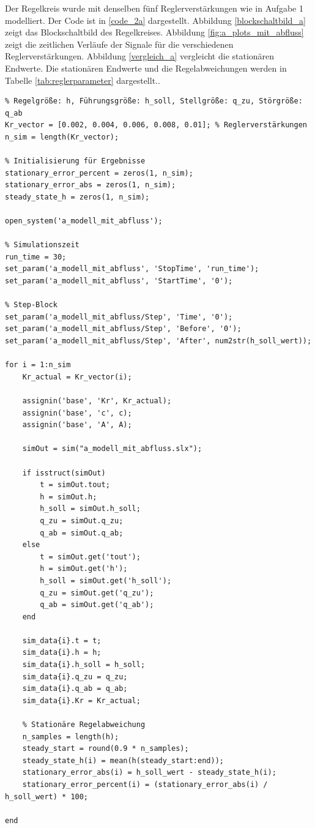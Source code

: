 Der Regelkreis wurde mit denselben fünf Reglerverstärkungen wie in Aufgabe 1 modelliert. Der Code ist in \ref{code_2a} dargestellt. Abbildung \ref{blockschaltbild_a} zeigt das Blockschaltbild des Regelkreises. Abbildung \ref{fig:a_plots_mit_abfluss} zeigt die zeitlichen Verläufe der Signale für die verschiedenen Reglerverstärkungen. Abbildung \ref{vergleich_a} vergleicht die stationären Endwerte. Die stationären Endwerte und die Regelabweichungen werden in Tabelle \ref{tab:reglerparameter} dargestellt..

\begin{sourcecode}
    \caption{\textit{Matlab}-Code zur Simulation und Berechnung der stationären Regelabweichung}
    \begin{verbatim}
% Regelgröße: h, Führungsgröße: h_soll, Stellgröße: q_zu, Störgröße: q_ab
Kr_vector = [0.002, 0.004, 0.006, 0.008, 0.01]; % Reglerverstärkungen
n_sim = length(Kr_vector);

% Initialisierung für Ergebnisse
stationary_error_percent = zeros(1, n_sim);
stationary_error_abs = zeros(1, n_sim);
steady_state_h = zeros(1, n_sim);

open_system('a_modell_mit_abfluss');

% Simulationszeit
run_time = 30;
set_param('a_modell_mit_abfluss', 'StopTime', 'run_time');
set_param('a_modell_mit_abfluss', 'StartTime', '0');

% Step-Block
set_param('a_modell_mit_abfluss/Step', 'Time', '0');
set_param('a_modell_mit_abfluss/Step', 'Before', '0');
set_param('a_modell_mit_abfluss/Step', 'After', num2str(h_soll_wert));

for i = 1:n_sim
    Kr_actual = Kr_vector(i);
    
    assignin('base', 'Kr', Kr_actual);
    assignin('base', 'c', c);
    assignin('base', 'A', A);
    
    simOut = sim("a_modell_mit_abfluss.slx");

    if isstruct(simOut)
        t = simOut.tout;
        h = simOut.h;
        h_soll = simOut.h_soll;
        q_zu = simOut.q_zu;
        q_ab = simOut.q_ab;
    else
        t = simOut.get('tout');
        h = simOut.get('h');
        h_soll = simOut.get('h_soll');
        q_zu = simOut.get('q_zu');
        q_ab = simOut.get('q_ab');
    end
    
    sim_data{i}.t = t;
    sim_data{i}.h = h;
    sim_data{i}.h_soll = h_soll;
    sim_data{i}.q_zu = q_zu;
    sim_data{i}.q_ab = q_ab;
    sim_data{i}.Kr = Kr_actual;
    
    % Stationäre Regelabweichung 
    n_samples = length(h);
    steady_start = round(0.9 * n_samples); 
    steady_state_h(i) = mean(h(steady_start:end));
    stationary_error_abs(i) = h_soll_wert - steady_state_h(i);
    stationary_error_percent(i) = (stationary_error_abs(i) / h_soll_wert) * 100;
    
end
    \end{verbatim}
\label{code_2a}
\end{sourcecode}

